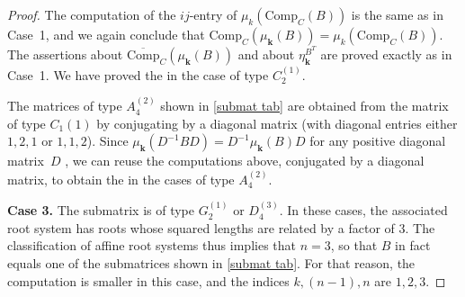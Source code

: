 \documentclass{amsart}
\theoremstyle{definition}
\theoremstyle{remark}
\numberwithin{equation}{section}
\newcommand{\0}{{\mathbf{0}}}
\newcommand{\Comp}{\mathrm{Comp}_C}
\newcommand{\CompPlus}{\overline{\mathrm{Comp}}_C}
\newcommand{\kk}{{\boldsymbol{k}}}
\begin{document}
\begin{proof}
The computation of the $ij$-entry of $\mu_k(\Comp(B))$ is the same as in Case~1, and we again conclude that $\Comp(\mu_\kk(B))=\mu_k(\Comp(B))$.
The assertions about $\CompPlus(\mu_\kk(B))$ and about $\eta^{B^T}_\kk$ are proved exactly as in Case~1.
We have proved the  in the case of type $C_2^{(1)}$.

The matrices of type $A_4^{(2)}$ shown in \cref{submat tab} are obtained from the matrix of type $C_1{(1)}$ by conjugating by a diagonal matrix (with diagonal entries either $1,2,1$ or $1,1,2$).
Since $\mu_\kk(D^{-1}BD)=D^{-1}\mu_\kk(B)D$ for any positive diagonal matrix~$D$ \cite[Proposition~4.5]{ca1}, we can reuse the computations above, conjugated by a diagonal matrix, to obtain the  in the cases of type $A_4^{(2)}$.

\medskip

\noindent
\textbf{Case 3.}
The submatrix is of type  $G_2^{(1)}$ or $D_4^{(3)}$.
In these cases, the associated root system has roots whose squared lengths are related by a factor of $3$.
The classification of affine root systems thus implies that $n=3$, so that $B$ in fact equals one of the submatrices shown in \cref{submat tab}.
For that reason, the computation is smaller in this case, and the indices $k,(n-1),n$ are $1,2,3$.


\end{proof}
\end{document}
